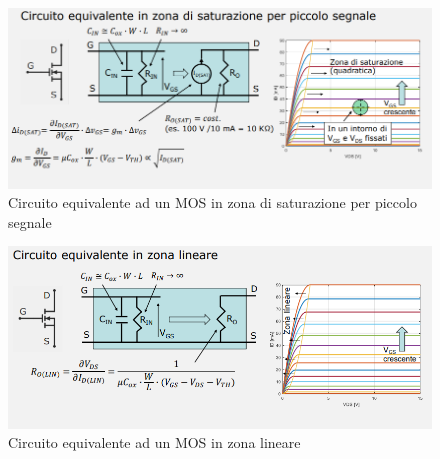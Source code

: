 \documentclass{article}
\begin{document}
\begin{figure}[h]
  \centering
  \includegraphics[scale=0.6]{IM_MOS_equivalente_saturazione_bis}
  \caption{Circuito equivalente ad un MOS in zona di saturazione per piccolo segnale}
  \label{Schema_MOS_equivalente_saturazione_bis}
\end{figure}

\begin{figure}[h]
  \centering
  \includegraphics[scale=0.6]{IM_MOS_equivalente_lineare}
  \caption{Circuito equivalente ad un MOS in zona lineare}
  \label{Schema_MOS_equivalente_lineare}
\end{figure}
\end{document}
